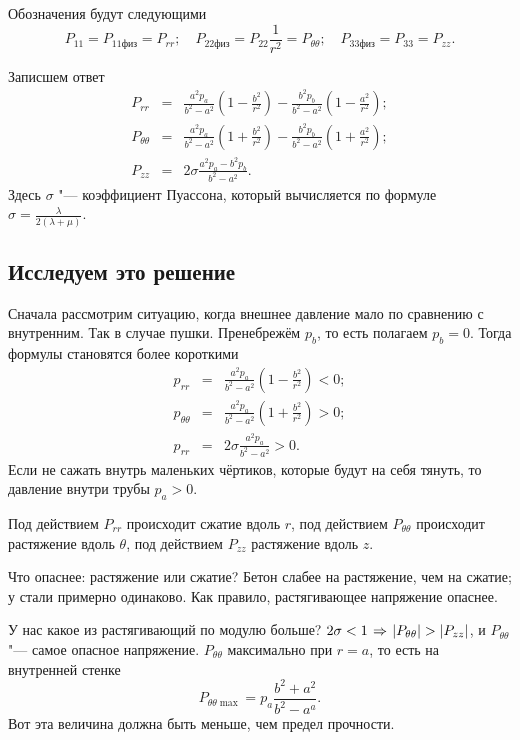 Обозначения будут следующими
\[
  P_{11} = P_{11\text{физ}} = P_{rr};\quad
  P_{22\text{физ}} = P_{22}\frac1{r^2} = P_{\theta\theta};\quad
  P_{33\text{физ}} = P_{33} = P_{zz}.
\]

Записшем ответ
\begin{eqnarray*}
  P_{rr}&=& \frac{a^2 p_a}{b^2-a^2}\left( 1-\frac{b^2}{r^2} \right) - \frac{b^2 p_b}{b^2-a^2}\left( 1-\frac{a^2}{r^2} \right);\\
  P_{\theta\theta} &=& \frac{a^2 p_a}{b^2-a^2}\left( 1+\frac{b^2}{r^2} \right) - \frac{b^2p_b}{b^2-a^2}\left( 1+\frac{a^2}{r^2} \right);\\
   P_{zz} &=&  2\sigma\frac{a^2p_a - b^2p_b}{b^2-a^2}.
\end{eqnarray*}
Здесь $\sigma$ "--- коэффициент Пуассона, который вычисляется по формуле $\sigma = \frac{\lambda}{2(\lambda+\mu)}$.

\subsection{Исследуем это решение}
Сначала рассмотрим ситуацию, когда внешнее давление мало по сравнению с внутренним. Так в случае пушки. Пренебрежём $p_b$, то есть полагаем $p_b=0$. Тогда формулы становятся более короткими
\begin{eqnarray*}
  p_{rr} &=& \frac{a^2p_a}{b^2-a^2}\left( 1-\frac{b^2}{r^2} \right)<0;\\
  p_{\theta\theta} &=& \frac{a^2p_a}{b^2-a^2}\left( 1+\frac{b^2}{r^2} \right)>0;\\
  p_{rr} &=& 2\sigma\frac{a^2p_a}{b^2-a^2}>0.
\end{eqnarray*}
Если не сажать внутрь маленьких чёртиков, которые будут на себя тянуть, то давление внутри трубы $p_a>0$.


Под действием $P_{rr}$ происходит сжатие вдоль $r$, под действием $P_{\theta\theta}$ происходит растяжение вдоль $\theta$, под действием $P_{zz}$ растяжение вдоль $z$.

Что опаснее: растяжение или сжатие? Бетон слабее на растяжение, чем на сжатие; у стали примерно одинаково. Как правило, растягивающее напряжение опаснее.

У нас какое из растягивающий по модулю больше? $2\sigma<1\imp |P_{\theta\theta}|>|P_{zz}|$, и $P_{\theta\theta}$ "--- самое опасное напряжение.
$P_{\theta\theta}$ максимально при $r=a$, то есть на внутренней стенке
\[
 P_{\theta\theta\max} = p_a\frac{b^2+a^2}{b^2-a^a}.
\]
Вот эта величина должна быть меньше, чем предел прочности.

